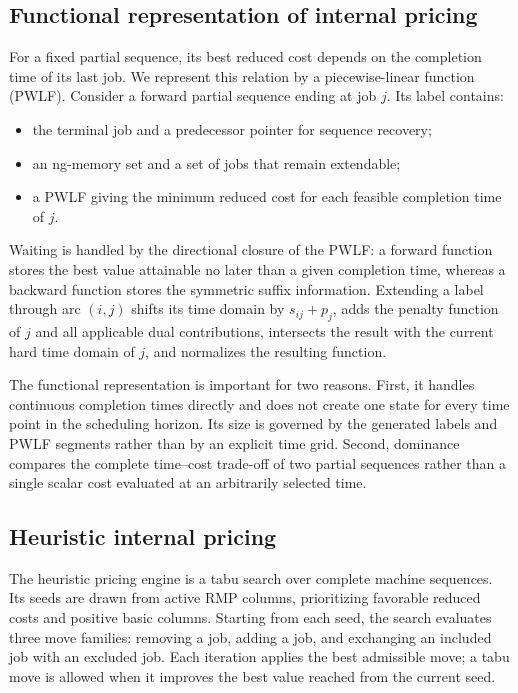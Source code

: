 \subsection{Functional representation of internal pricing}
\label{subsec:functional-pricing}

For a fixed partial sequence, its best reduced cost depends on the completion time
of its last job. We represent this relation by a piecewise-linear function (PWLF).
Consider a forward partial sequence ending at job $j$. Its label contains:
\begin{itemize}
    \item the terminal job and a predecessor pointer for sequence recovery;
    \item an ng-memory set and a set of jobs that remain extendable;
    \item a PWLF giving the minimum reduced cost for each feasible completion time
    of $j$.
\end{itemize}
Waiting is handled by the directional closure of the PWLF: a forward function
stores the best value attainable no later than a given completion time, whereas a
backward function stores the symmetric suffix information. Extending a label
through arc $(i,j)$ shifts its time domain by $s_{ij}+p_j$, adds the penalty
function of $j$ and all applicable dual contributions, intersects the result with
the current hard time domain of $j$, and normalizes the resulting function.

The functional representation is important for two reasons. First, it handles
continuous completion times directly and does not create one state for every time
point in the scheduling horizon. Its size is governed by the generated labels and
PWLF segments rather than by an explicit time grid. Second, dominance compares the
complete time--cost trade-off of two partial sequences rather than a single scalar
cost evaluated at an arbitrarily selected time.

\subsection{Heuristic internal pricing}

The heuristic pricing engine is a tabu search over complete machine sequences. Its
seeds are drawn from active RMP columns, prioritizing favorable reduced costs and
positive basic columns. Starting from each seed, the search evaluates three move
families: removing a job, adding a job, and exchanging an included job with an
excluded job. Each iteration applies the best admissible move; a tabu move is
allowed when it improves the best value reached from the current seed.

